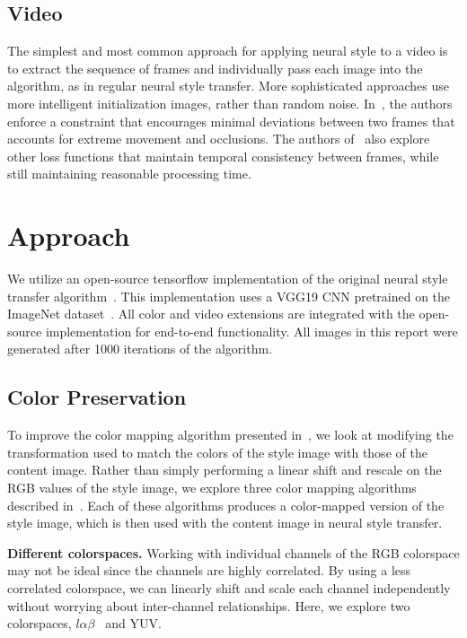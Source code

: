 \documentclass[10pt,twocolumn,letterpaper]{article}
\begin{document}
\subsection{Video}
The simplest and most common approach for applying neural style to a video is to extract the sequence of frames and individually pass each image into the algorithm, as in regular neural style transfer. More sophisticated approaches use more intelligent initialization images, rather than random noise. In~\cite{video1}, the authors enforce a constraint that encourages minimal deviations between two frames that accounts for extreme movement and occlusions. The authors of~\cite{video2} also explore other loss functions that maintain temporal consistency between frames, while still maintaining reasonable processing time.

\section{Approach}
We utilize an open-source tensorflow implementation of the original neural style transfer algorithm~\cite{neuralstyle}. This implementation uses a VGG19 CNN pretrained on the ImageNet dataset~\cite{vgg}. All color and video extensions are integrated with the open-source implementation for end-to-end functionality. All images in this report were generated after 1000 iterations of the algorithm.

\subsection{Color Preservation}
To improve the color mapping algorithm presented in~\cite{gatys-color}, we look at modifying the transformation used to match the colors of the style image with those of the content image. Rather than simply performing a linear shift and rescale on the RGB values of the style image, we explore three color mapping algorithms described in~\cite{color}. Each of these algorithms produces a color-mapped version of the style image, which is then used with the content image in neural style transfer.

\bigbreak\noindent\textbf{Different colorspaces.}
Working with individual channels of the RGB colorspace may not be ideal since the channels are highly correlated. By using a less correlated colorspace, we can linearly shift and scale each channel independently without worrying about inter-channel relationships. Here, we explore two colorspaces, $l\alpha\beta$~\cite{lab} and YUV.
\end{document}
